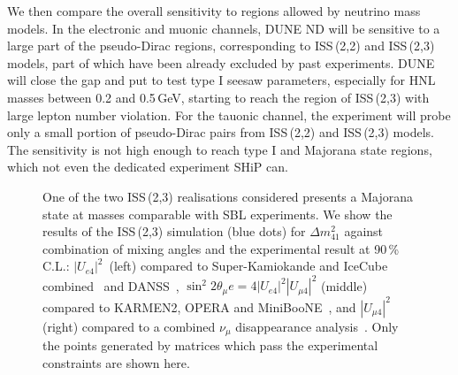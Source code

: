 We then compare the overall sensitivity to regions allowed by neutrino mass models.
In the electronic and muonic channels, DUNE ND will be sensitive to a large part of the pseudo-Dirac regions, %
corresponding to ISS\,(2,2) and ISS\,(2,3) models, %
part of which have been already excluded by past experiments.
DUNE will close the gap and put to test type I seesaw parameters, especially for HNL masses between 0.2 and 0.5\,GeV, %
starting to reach the region of ISS\,(2,3) with large lepton number violation.
For the tauonic channel, the experiment will probe only a small portion %
of pseudo-Dirac pairs from ISS\,(2,2) and ISS\,(2,3) models.
The sensitivity is not high enough to reach type I and Majorana state regions, which not even the dedicated experiment SHiP can.

\begin{figure}
	\centering
	{\resizebox{\linewidth}{!}{}}
	\caption{One of the two ISS\,(2,3) realisations considered presents a Majorana state at masses comparable with SBL experiments.
		We show the results of the ISS\,(2,3) simulation (blue dots) for $\Delta m_{4 1}^2$ against combination of mixing angles and %
		the experimental result at 90\,\% C.L.: %
		$|U_{e 4}|^2$~(left) compared to Super-Kamiokande and IceCube combined~\cite{Dentler:2018sju} and DANSS~\cite{Alekseev:2018efk}, %
		\mbox{$\sin^2 2\theta{_\mu e} = 4|U_{e 4}|^2|U_{\mu 4}|^2$} (middle) compared to KARMEN2, OPERA and MiniBooNE~\cite{Aguilar-Arevalo:2018gpe},
		and $|U_{\mu 4}|^2$ (right) compared to a combined $\nu_\mu$ disappearance analysis~\cite{Dentler:2018sju}.
		Only the points generated by matrices which pass the experimental constraints are shown here.}
	\label{fig:sblosc}
\end{figure}

